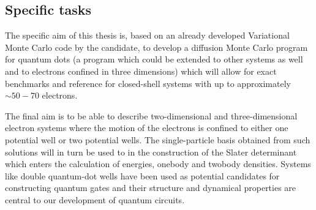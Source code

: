 \documentclass[twocolumn]{revtex4}
\begin{document}
\subsection*{Specific tasks}
The specific aim of this thesis is, based on an already developed Variational Monte Carlo code by the candidate,
 to develop a diffusion Monte Carlo program for quantum dots (a program which could be extended to other systems as well and to electrons confined in three dimensions) which will allow for exact benchmarks and reference for
closed-shell systems with up to approximately $\sim 50-70$ electrons. 

The final aim is to be able to describe two-dimensional and
three-dimensional electron systems where the motion of the electrons
is confined to either one potential well or two potential wells.  The
single-particle basis obtained from such solutions will in turn be
used to in the construction of the Slater determinant which enters the
calculation of energies, onebody and twobody densities. 
Systems like double quantum-dot wells have been used as potential candidates for constructing quantum gates and their structure and dynamical properties are central to our development of quantum circuits. 
\end{document}
